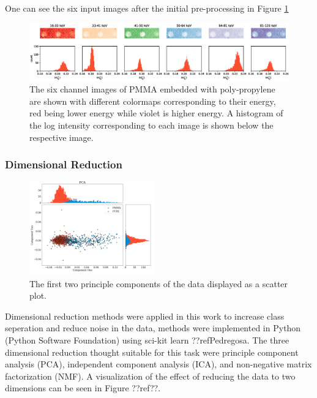 \documentclass[a4paper,11pt]{article}
\begin{document}
One can see the six input images after the initial pre-processing in Figure \ref{demonstrating_bins}

\begin{figure}[htbp]

\includegraphics[width=\textwidth]{figures/poly_figure2.eps}

\caption{The six channel images of PMMA embedded with poly-propylene are shown with different colormaps corresponding to their energy, red being lower energy while violet is higher energy. A histogram of the log intensity corresponding to each image is shown below the respective image.}
\label{demonstrating_bins}
\end{figure}

\subsubsection{Dimensional Reduction}

\begin{figure}
  \vspace{-20pt}
  \begin{center}
    \includegraphics[width=0.48\textwidth]{figures/PCAnone.png}
  \end{center}
  \vspace{-20pt}
  \caption{The first two principle components of the data displayed as a scatter plot.}
  \label{PCA}
  \vspace{-10pt}
\end{figure}

Dimensional reduction methods were applied in this work to increase class seperation and reduce noise in the data, methods were implemented in Python (Python Software Foundation) using sci-kit learn ??ref{Pedregosa}. The three dimensional reduction thought suitable for this task were principle component analysis (PCA), independent component analysis (ICA), and non-negative matrix factorization (NMF). A visualization of the effect of reducing the data to two dimensions can be seen in Figure ??ref??.
\end{document}
